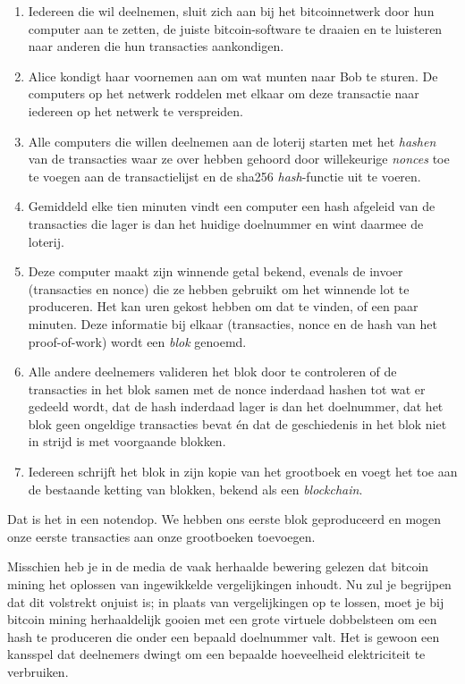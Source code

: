 \documentclass[
  letterpaper,
]{scrbook}
\begin{document}
\begin{enumerate}
\def\labelenumi{\arabic{enumi}.}
\item
  Iedereen die wil deelnemen, sluit zich aan bij het bitcoinnetwerk door
  hun computer aan te zetten, de juiste bitcoin-software te draaien en
  te luisteren naar anderen die hun transacties aankondigen.
\item
  Alice kondigt haar voornemen aan om wat munten naar Bob te sturen. De
  computers op het netwerk roddelen met elkaar om deze transactie naar
  iedereen op het netwerk te verspreiden.
\item
  Alle computers die willen deelnemen aan de loterij starten met het
  \emph{hashen} van de transacties waar ze over hebben gehoord door
  willekeurige \emph{nonces} toe te voegen aan de transactielijst en de
  sha256 \emph{hash}-functie uit te voeren.
\item
  Gemiddeld elke tien minuten vindt een computer een hash afgeleid van
  de transacties die lager is dan het huidige doelnummer en wint daarmee
  de loterij.
\item
  Deze computer maakt zijn winnende getal bekend, evenals de invoer
  (transacties en nonce) die ze hebben gebruikt om het winnende lot te
  produceren. Het kan uren gekost hebben om dat te vinden, of een paar
  minuten. Deze informatie bij elkaar (transacties, nonce en de hash van
  het proof-of-work) wordt een \emph{blok} genoemd.
\item
  Alle andere deelnemers valideren het blok door te controleren of de
  transacties in het blok samen met de nonce inderdaad hashen tot wat er
  gedeeld wordt, dat de hash inderdaad lager is dan het doelnummer, dat
  het blok geen ongeldige transacties bevat én dat de geschiedenis in
  het blok niet in strijd is met voorgaande blokken.
\item
  Iedereen schrijft het blok in zijn kopie van het grootboek en voegt
  het toe aan de bestaande ketting van blokken, bekend als een
  \emph{blockchain}.
\end{enumerate}

Dat is het in een notendop. We hebben ons eerste blok geproduceerd en
mogen onze eerste transacties aan onze grootboeken toevoegen.

Misschien heb je in de media de vaak herhaalde bewering gelezen dat
bitcoin mining het oplossen van ingewikkelde vergelijkingen inhoudt. Nu
zul je begrijpen dat dit volstrekt onjuist is; in plaats van
vergelijkingen op te lossen, moet je bij bitcoin mining herhaaldelijk
gooien met een grote virtuele dobbelsteen om een hash te produceren die
onder een bepaald doelnummer valt. Het is gewoon een kansspel dat
deelnemers dwingt om een bepaalde hoeveelheid elektriciteit te
verbruiken.
\end{document}
